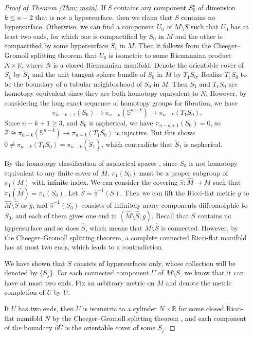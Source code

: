 \documentclass[11pt, reqno]{amsart}
\numberwithin{equation}{section}
\theoremstyle{definition}
\begin{document}
\begin{proof}[Proof of Theorem \ref{Thm: main}]
If $S$ contains any component $S_0^k$ of dimension $k \le n-2$ that is not a hypersurface, then we claim that $S$ contains no hypersurface. Otherwise, we can find a component $U_0$ of $M\setminus S$ such that $U_0$ has at least two ends, for which one is compactified by $S_0$ in $M$ and the other is compactified by some hypersurface $S_1$ in $M$. Then it follows from the Cheeger--Gromoll splitting theorem \cite[Theorem 4]{CG71} that $U_0$ is isometric to some Riemannian product $N\times \mathbb R$, where $N$ is a closed Riemannian manifold. Denote the orientable cover of $S_1$ by $\check S_1$ and the unit tangent sphere bundle of $S_0$ in $M$ by $T_1S_0$. Realize $T_1S_0$ to be the boundary of a tubular neighborhood of $S_0$ in $M$.
Then $\check S_1$ and $T_1S_0$ are homotopy equivalent since they are both homotopy equivalent to $N$.
However, by considering the long exact sequence of homotopy groups for fibration, we have
\[
\pi_{n-k+1}(S_0) \to \pi_{n-k}(\mathbb{S}^{n-k}) \to \pi_{n-k}(T_1S_0).
\]
Since $n-k+1 \ge 3$, and $S_0$ is aspherical, we have $\pi_{n-k+1}(S_0) = 0$, so $\mathbb Z \cong \pi_{n-k}(\mathbb{S}^{n-k}) \to \pi_{n-k}(T_1S_0)$ is injective. But this shows $0 \neq \pi_{n-k}(T_1S_0) = \pi_{n-k}(\check S_1)$, which contradicts that $\check S_1$ is aspherical.


By the homotopy classification of aspherical spaces \cite[Theorem 1.1]{Luc08}, since $S_0$ is not
homotopy equivalent to any finite cover of $M$, $\pi_1(S_0)$ must be a proper subgroup of $\pi_1(M)$ with infinite index. We can consider the covering $\hat\pi: \hat M \to M$ such that $\pi_1(\hat M) = \pi_1(S_0)$. Let $\hat S = \hat\pi^{-1}(S)$. Then we can lift the Ricci-flat metric $g$ to $\hat M \setminus \hat S$ as $\hat g$, and $\hat \pi^{-1}(S_0)$ consists of infinitely many components diffeomorphic to $S_0$, and each of them gives one end in $(\hat M \setminus \hat S, \hat g)$. Recall that $S$ contains no hypersurface and so does $\hat S$, which means that $\hat M\setminus \hat S$ is connected. However, by the Cheeger--Gromoll splitting theorem, a complete connected Ricci-flat manifold has at most two ends, which leads to a contradiction.

We have shown that $S$ consists of hypersurfaces  only, whose collection will be denoted by $\{S_j\}$. For each connected component $U$ of $M\setminus S$, we know that it can have at most two ends. Fix an arbitrary metric on $M$ and denote the metric completion of $U$ by $\overline U$.

If $U$ has two ends, then $ U$ is isometric to a cylinder $N\times \mathbb R$ for some closed Ricci-flat manifold $N$ by the Cheeger--Gromoll splitting theorem \cite[Theorem 4]{CG71}, and each component of the boundary $\partial\overline U$ is the orientable cover of some $S_j$.



\end{proof}
\end{document}
